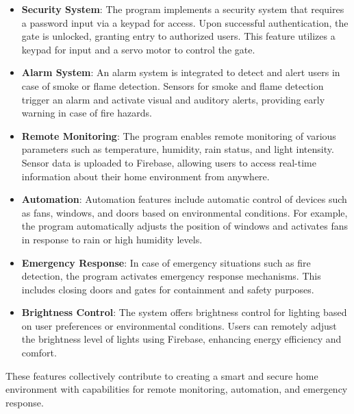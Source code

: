 \begin{itemize}
    \item \textbf{Security System}: The program implements a security system that requires a password input via a keypad for access. Upon successful authentication, the gate is unlocked, granting entry to authorized users. This feature utilizes a keypad for input and a servo motor to control the gate.

    \item \textbf{Alarm System}: An alarm system is integrated to detect and alert users in case of smoke or flame detection. Sensors for smoke and flame detection trigger an alarm and activate visual and auditory alerts, providing early warning in case of fire hazards.

    \item \textbf{Remote Monitoring}: The program enables remote monitoring of various parameters such as temperature, humidity, rain status, and light intensity. Sensor data is uploaded to Firebase, allowing users to access real-time information about their home environment from anywhere.

    \item \textbf{Automation}: Automation features include automatic control of devices such as fans, windows, and doors based on environmental conditions. For example, the program automatically adjusts the position of windows and activates fans in response to rain or high humidity levels.

    \item \textbf{Emergency Response}: In case of emergency situations such as fire detection, the program activates emergency response mechanisms. This includes closing doors and gates for containment and safety purposes.

    \item \textbf{Brightness Control}: The system offers brightness control for lighting based on user preferences or environmental conditions. Users can remotely adjust the brightness level of lights using Firebase, enhancing energy efficiency and comfort.
\end{itemize}

These features collectively contribute to creating a smart and secure home environment with capabilities for remote monitoring, automation, and emergency response.
